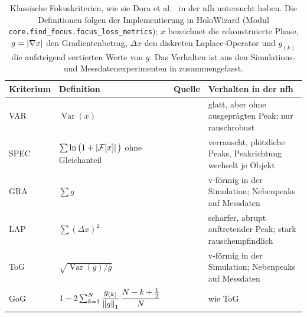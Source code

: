 \begin{table}[tb]
  \centering
  \small
  \caption[Klassische Fokuskriterien und ihr Verhalten in der NFH]{%
    Klassische Fokuskriterien, wie sie Dora et al.\ \cite{dora2025autofocus} in
    der \ac{nfh} untersucht haben. Die Definitionen folgen der Implementierung in HoloWizard
    \cite{dora2026holowizard} (Modul \texttt{core.find\_focus.focus\_loss\_metrics});
    $x$ bezeichnet die rekonstruierte Phase, $g = \abs{\nabla x}$ den
    Gradientenbetrag, $\Delta x$ den diskreten Laplace-Operator und $g_{(k)}$
    die aufsteigend sortierten Werte von $g$. Das Verhalten ist aus den
    Simulations- und Messdatenexperimenten in \cite{dora2025autofocus}
    zusammengefasst.}
  \label{tab:stand:kriterien}
  \begin{tabular}{@{}l L{4.4cm} l L{5.6cm}@{}}
    \toprule
    Kriterium & Definition & Quelle & Verhalten in der \acs{nfh} \cite{dora2025autofocus} \\
    \midrule
    VAR  & $\operatorname{Var}(x)$ & \cite{langehanenberg2008autofocusing} & glatt, aber ohne ausgeprägten Peak; nur rauschrobust \\
    \addlinespace
    SPEC & $\sum \ln\big(1 + \left\lvert \mathcal{F}[x] \right\rvert\big)$ ohne Gleichanteil & \cite{langehanenberg2008autofocusing} & verrauscht, plötzliche Peaks, Peakrichtung wechselt je Objekt \\
    \addlinespace
    GRA  & $\sum g$ & \cite{langehanenberg2008autofocusing} & v-förmig in der Simulation; Nebenpeaks auf Messdaten \\
    \addlinespace
    LAP  & $\sum (\Delta x)^2$ & \cite{langehanenberg2008autofocusing} & scharfer, abrupt auftretender Peak; stark rauschempfindlich \\
    \addlinespace
    ToG  & $\sqrt{\operatorname{Var}(g)/\overline{g}}$ & \cite{memmolo2011automatic,zhang2017edge} & v-förmig in der Simulation; Nebenpeaks auf Messdaten \\
    \addlinespace
    GoG  & $1 - 2\sum_{k=1}^{N} \dfrac{g_{(k)}}{\left\lVert g \right\rVert_1}\,\dfrac{N - k + \frac12}{N}$ & \cite{zhang2017edge} & wie ToG \\
    \bottomrule
  \end{tabular}
\end{table}

